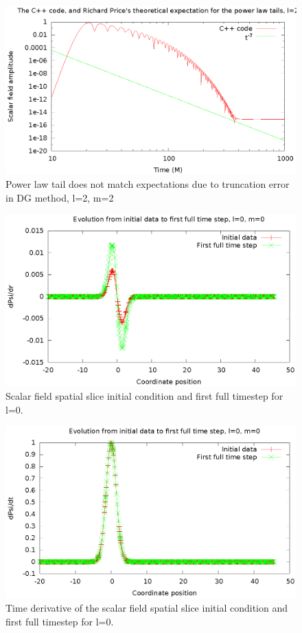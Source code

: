 \begin{figure}
  \includegraphics{l2m2tailfail2}
  \caption{Power law tail does not match expectations due to truncation error in DG method, l=2, m=2}
\end{figure}

\begin{figure}
  \includegraphics{phi1dl0}
  \caption{Scalar field spatial slice initial condition and first full timestep for l=0.}
\end{figure}

\begin{figure}
  \includegraphics{rho1dl0}
  \caption{Time derivative of the scalar field spatial slice initial condition and first full timestep for l=0.}
\end{figure}

